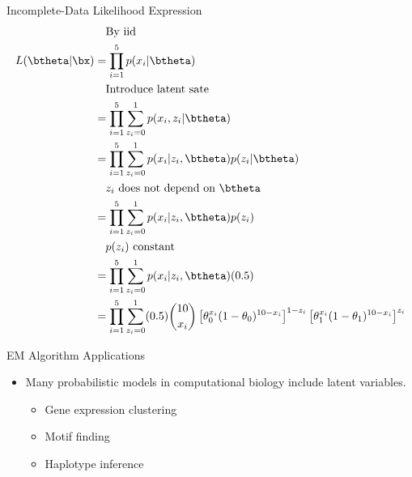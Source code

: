 \documentclass[dvipdfmx,bigger,aspectratio=169]{beamer}
\begin{document}
\begin{frame}[allowframebreaks,label=,t]{Incomplete-Data Likelihood Expression}
\begin{align*}
  &~~~\text{By iid}\\
  L(\btheta | \bx)
  &= \prod^{5}_{i=1}p(x_{i} | \btheta)\\
  &~~~\text{Introduce latent sate}\\
  &= \prod^{5}_{i=1} \sum^{1}_{z_{i}=0} p(x_{i}, z_{i} | \btheta)\\
  &= \prod^{5}_{i=1} \sum^{1}_{z_{i}=0} p(x_{i} | z_{i}, \btheta) p(z_{i} | \btheta)\\
  &~~~\text{$z_{i}$ does not depend on $\btheta$}\\
  &= \prod^{5}_{i=1} \sum^{1}_{z_{i}=0} p(x_{i} | z_{i}, \btheta) p(z_{i})\\
  &~~~\text{$p(z_{i})$ constant}\\
  &= \prod^{5}_{i=1} \sum^{1}_{z_{i}=0} p(x_{i} | z_{i}, \btheta) (0.5)\\
  &= \prod^{5}_{i=1} \sum^{1}_{z_{i}=0}
    (0.5) \binom{10}{x_{i}}
    \left[ \theta_{0}^{x_{i}}(1-\theta_{0})^{10-x_{i}} \right]^{1-z_{i}}
    \left[ \theta_{1}^{x_{i}}(1-\theta_{1})^{10-x_{i}} \right]^{z_{i}}\\
\end{align*}
\end{frame}


\begin{frame}[label={sec:orgd0aafc6}]{EM Algorithm Applications}
\begin{itemize}
\item Many probabilistic models in computational biology include latent variables. \cite{doWhatExpectationMaximization2008}
\begin{itemize}
\item Gene expression clustering
\item Motif finding
\item Haplotype inference
\end{itemize}
\end{itemize}
\end{frame}
\end{document}

